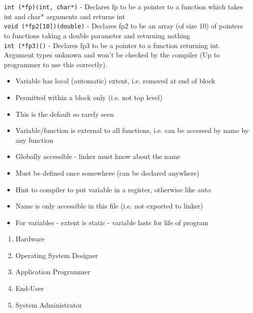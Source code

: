 \documentclass[number]{notes}
\begin{document}
\begin{landscape}
\headfoot
\begin{multicols}{3}

\texttt{int (*fp)(int, char*)} - Declares fp to be a pointer to a function which takes int and char* arguments and returns int\\
\texttt{void (*fp2[10])(double)} - Declares fp2 to be an array (of size 10) of pointers to functions taking a double parameter and returning nothing\\
\texttt{int (*fp3)()} - Declares fp3 to be a pointer to a function returning int. Argument types unknown and won't be checked by the compiler (Up to programmer to use this correctly).

\begin{itemize}[nolistsep]
    \item Variable has local (automatic) extent, i.e. removed at end of block
    \item Permitted within a block only (i.e. not top level)
    \item This is the default so rarely seen
\end{itemize}
\begin{itemize}[nolistsep]
    \item Variable/function is external to all functions, i.e. can be accessed by name by any function
    \item Globally accessible - linker must know about the name
    \item Must be defined once somewhere (can be declared anywhere)
\end{itemize}
\begin{itemize}[nolistsep]
    \item Hint to compiler to put variable in a register, otherwise like auto
\end{itemize}
\begin{itemize}[nolistsep]
    \item Name is only accessible in this file (i.e. not exported to linker)
    \item For variables - extent is static - variable lasts for life of program
\end{itemize}

\begin{enumerate}[nolistsep]
    \item Hardware
    \item Operating System Designer
    \item Application Programmer
    \item End-User
    \item System Administrator
\end{enumerate}


\end{multicols}
\end{landscape}
\end{document}
